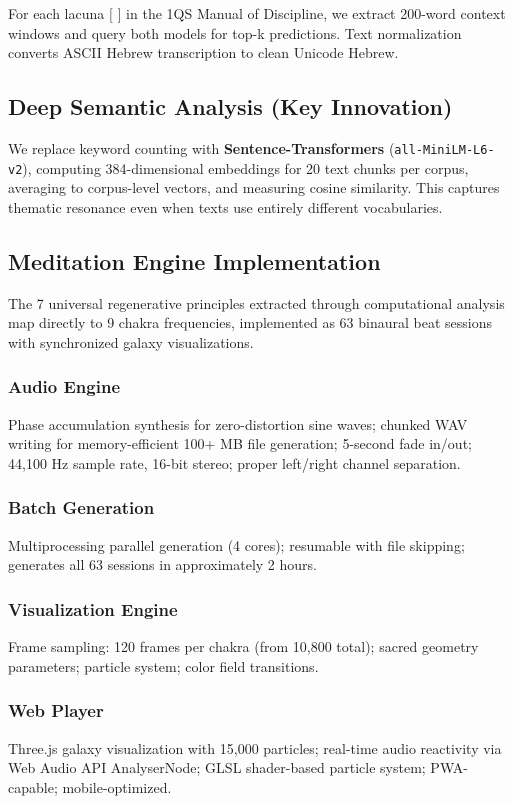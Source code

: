 \documentclass[11pt]{article}
\begin{document}
For each lacuna $[$ $]$ in the 1QS Manual of Discipline, we extract 200-word context windows and query both models for top-k predictions. Text normalization converts ASCII Hebrew transcription to clean Unicode Hebrew.

\subsection{Deep Semantic Analysis (Key Innovation)}

We replace keyword counting with \textbf{Sentence-Transformers} (\texttt{all-MiniLM-L6-v2}), computing 384-dimensional embeddings for 20 text chunks per corpus, averaging to corpus-level vectors, and measuring cosine similarity. This captures thematic resonance even when texts use entirely different vocabularies.

\subsection{Meditation Engine Implementation}

The 7 universal regenerative principles extracted through computational analysis map directly to 9 chakra frequencies, implemented as 63 binaural beat sessions with synchronized galaxy visualizations.

\subsubsection{Audio Engine}
Phase accumulation synthesis for zero-distortion sine waves; chunked WAV writing for memory-efficient 100+ MB file generation; 5-second fade in/out; 44,100 Hz sample rate, 16-bit stereo; proper left/right channel separation.

\subsubsection{Batch Generation}
Multiprocessing parallel generation (4 cores); resumable with file skipping; generates all 63 sessions in approximately 2 hours.

\subsubsection{Visualization Engine}
Frame sampling: 120 frames per chakra (from 10,800 total); sacred geometry parameters; particle system; color field transitions.

\subsubsection{Web Player}
Three.js galaxy visualization with 15,000 particles; real-time audio reactivity via Web Audio API AnalyserNode; GLSL shader-based particle system; PWA-capable; mobile-optimized.
\end{document}
